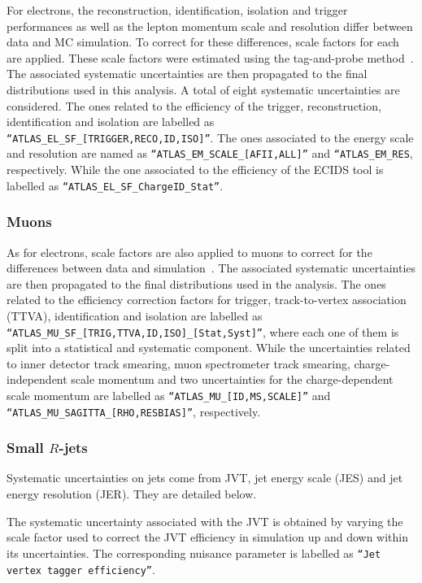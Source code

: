 For electrons, the reconstruction, identification, isolation and trigger performances as well as the lepton momentum scale and resolution differ between data and MC simulation. To correct for these differences, scale factors for each are applied. These scale factors were estimated using the tag-and-probe method~\cite{Aad:2019tso}. The associated systematic uncertainties are then propagated to the final distributions used in this analysis.  A total of eight systematic uncertainties are considered. The ones  related to the efficiency of the trigger, reconstruction, identification and isolation are labelled as \texttt{``ATLAS\_EL\_SF\_[TRIGGER,RECO,ID,ISO]''}.  The ones associated to the energy scale and resolution are named as  \texttt{``ATLAS\_EM\_SCALE\_[AFII,ALL]''} and \texttt{``ATLAS\_EM\_RES}, respectively.  While the one associated to the efficiency of the  ECIDS tool is labelled as \texttt{``ATLAS\_EL\_SF\_ChargeID\_Stat''}. 



\subsubsection{Muons}

As for electrons, scale factors are also applied to muons to correct for the differences between data and simulation~\cite{Aad:2020gmm}. The associated systematic uncertainties are then propagated to the final distributions used in the analysis. The ones related to the efficiency correction factors for trigger, track-to-vertex association (TTVA), identification and isolation are labelled as \texttt{``ATLAS\_MU\_SF\_[TRIG,TTVA,ID,ISO]\_[Stat,Syst]''}, where each one of them is split into a statistical and systematic component.  While the uncertainties related to inner detector track smearing, muon spectrometer track smearing, charge-independent scale momentum and two uncertainties for the charge-dependent scale momentum are labelled as \texttt{``ATLAS\_MU\_[ID,MS,SCALE]''} and  \texttt{``ATLAS\_MU\_SAGITTA\_[RHO,RESBIAS]''},   respectively.  




\subsubsection{Small $R$-jets}

Systematic uncertainties on jets come from  JVT, jet energy scale (JES) and jet energy resolution (JER). They are detailed below.

The systematic uncertainty associated with the JVT is obtained by varying the scale factor used to correct the JVT efficiency in simulation up and down within its uncertainties.  The corresponding nuisance parameter is labelled as \texttt{``Jet vertex tagger efficiency''}. 

